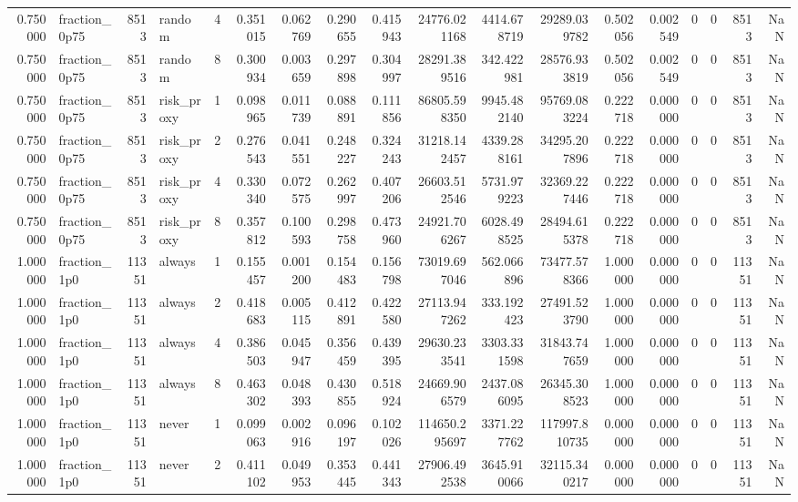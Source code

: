 \begin{tabular}{rlrlrrrrrrrrrrrrrr}
0.750000 & fraction\_0p75 & 8513 & random & 4 & 0.351015 & 0.062769 & 0.290655 & 0.415943 & 24776.021168 & 4414.678719 & 29289.039782 & 0.502056 & 0.002549 & 0 & 0 & 8513 & NaN \\
0.750000 & fraction\_0p75 & 8513 & random & 8 & 0.300934 & 0.003659 & 0.297898 & 0.304997 & 28291.389516 & 342.422981 & 28576.933819 & 0.502056 & 0.002549 & 0 & 0 & 8513 & NaN \\
0.750000 & fraction\_0p75 & 8513 & risk\_proxy & 1 & 0.098965 & 0.011739 & 0.088891 & 0.111856 & 86805.598350 & 9945.482140 & 95769.083224 & 0.222718 & 0.000000 & 0 & 0 & 8513 & NaN \\
0.750000 & fraction\_0p75 & 8513 & risk\_proxy & 2 & 0.276543 & 0.041551 & 0.248227 & 0.324243 & 31218.142457 & 4339.288161 & 34295.207896 & 0.222718 & 0.000000 & 0 & 0 & 8513 & NaN \\
0.750000 & fraction\_0p75 & 8513 & risk\_proxy & 4 & 0.330340 & 0.072575 & 0.262997 & 0.407206 & 26603.512546 & 5731.979223 & 32369.227446 & 0.222718 & 0.000000 & 0 & 0 & 8513 & NaN \\
0.750000 & fraction\_0p75 & 8513 & risk\_proxy & 8 & 0.357812 & 0.100593 & 0.298758 & 0.473960 & 24921.706267 & 6028.498525 & 28494.615378 & 0.222718 & 0.000000 & 0 & 0 & 8513 & NaN \\
1.000000 & fraction\_1p0 & 11351 & always & 1 & 0.155457 & 0.001200 & 0.154483 & 0.156798 & 73019.697046 & 562.066896 & 73477.578366 & 1.000000 & 0.000000 & 0 & 0 & 11351 & NaN \\
1.000000 & fraction\_1p0 & 11351 & always & 2 & 0.418683 & 0.005115 & 0.412891 & 0.422580 & 27113.947262 & 333.192423 & 27491.523790 & 1.000000 & 0.000000 & 0 & 0 & 11351 & NaN \\
1.000000 & fraction\_1p0 & 11351 & always & 4 & 0.386503 & 0.045947 & 0.356459 & 0.439395 & 29630.233541 & 3303.331598 & 31843.747659 & 1.000000 & 0.000000 & 0 & 0 & 11351 & NaN \\
1.000000 & fraction\_1p0 & 11351 & always & 8 & 0.463302 & 0.048393 & 0.430855 & 0.518924 & 24669.906579 & 2437.086095 & 26345.308523 & 1.000000 & 0.000000 & 0 & 0 & 11351 & NaN \\
1.000000 & fraction\_1p0 & 11351 & never & 1 & 0.099063 & 0.002916 & 0.096197 & 0.102026 & 114650.295697 & 3371.227762 & 117997.810735 & 0.000000 & 0.000000 & 0 & 0 & 11351 & NaN \\
1.000000 & fraction\_1p0 & 11351 & never & 2 & 0.411102 & 0.049953 & 0.353445 & 0.441343 & 27906.492538 & 3645.910066 & 32115.340217 & 0.000000 & 0.000000 & 0 & 0 & 11351 & NaN \\

\end{tabular}
